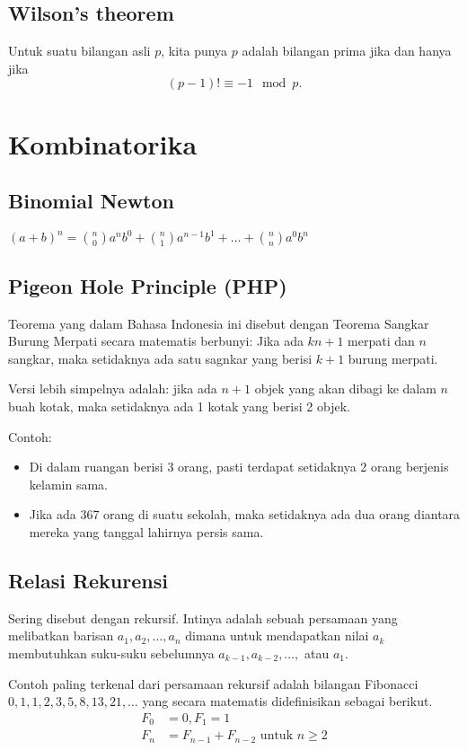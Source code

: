 \documentclass[11pt]{scrartcl}
\begin{document}
    \subsection{Wilson's theorem}
    Untuk suatu bilangan asli $p$, kita punya $p$ adalah bilangan prima jika dan hanya jika
    $$(p-1)! \equiv -1 \mod p.$$
    
\section{Kombinatorika}
    \subsection{Binomial Newton}
    $(a+b)^n = {n \choose 0} a^nb^0 + {n \choose 1} a^{n-1}b^1+ \dots +{n \choose n}a^0b^n$
    
    
    \subsection{Pigeon Hole Principle (PHP)}
    Teorema yang dalam Bahasa Indonesia ini disebut dengan Teorema Sangkar Burung Merpati secara matematis berbunyi:
    Jika ada $kn+1$ merpati dan $n$ sangkar, maka setidaknya ada satu sagnkar yang berisi $k+1$ burung merpati.
    
    Versi lebih simpelnya adalah: jika ada $n+1$ objek yang akan dibagi ke dalam $n$ buah kotak, maka setidaknya ada 1 kotak yang berisi 2 objek.
    
    Contoh: \begin{itemize}
        \item Di dalam ruangan berisi 3 orang, pasti terdapat setidaknya 2 orang berjenis kelamin sama.
        \item Jika ada 367 orang di suatu sekolah, maka setidaknya ada dua orang diantara mereka yang tanggal lahirnya persis sama.
    \end{itemize}
    
    \subsection{Relasi Rekurensi}
    Sering disebut dengan rekursif. Intinya adalah sebuah persamaan yang melibatkan barisan $a_1, a_2, \dots , a_n$ dimana untuk mendapatkan nilai $a_k$ membutuhkan suku-suku sebelumnya $a_{k-1}, a_{k-2}, \dots,$ atau $a_1$. 
    
    Contoh paling terkenal dari persamaan rekursif adalah bilangan Fibonacci $0,1,1,2,3,5,8,13,21,\dots$ yang secara matematis didefinisikan sebagai berikut.
    \begin{align*}
        F_0 &= 0, F_1 = 1\\
        F_n &= F_{n-1}+F_{n-2} \text{ untuk } n \ge 2
    \end{align*}
    
\end{document}
